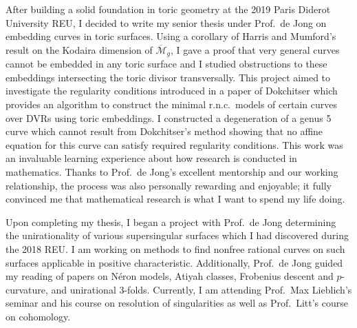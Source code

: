 \documentclass[11pt]{article}
\begin{document}
\par
After building a solid foundation in toric geometry at the 2019 Paris Diderot University REU, I decided to write my senior thesis under Prof.\ de Jong on embedding curves in toric surfaces. Using a corollary of Harris and Mumford's result on the Kodaira dimension of $\overline{\mathcal{M}}_g$, I gave a proof that very general curves cannot be embedded in any toric surface and I studied obstructions to these embeddings intersecting the toric divisor transversally. This project aimed to investigate the regularity conditions introduced in a paper of Dokchitser  which provides an algorithm to construct the minimal r.n.c.\ models of certain curves over DVRs using toric embeddings. I constructed a degeneration of a genus 5 curve which cannot result from Dokchitser's method showing that no affine equation for this curve can satisfy required regularity conditions. This work was an invaluable learning experience about how research is conducted in mathematics. Thanks to Prof.\ de Jong’s excellent mentorship and our working relationship, the process was also personally rewarding and enjoyable; it fully convinced me that mathematical research is what I want to spend my life doing. 
\par
Upon completing my thesis, I began a project with Prof.\ de Jong determining the unirationality of various supersingular surfaces which I had discovered during the 2018 REU.  I am working on methods to find nonfree rational curves on such surfaces applicable in positive characteristic. Additionally, Prof.\ de Jong guided my reading of papers on N\'{e}ron models, Atiyah classes, Frobenius descent and $p$-curvature, and unirational $3$-folds. Currently, I am attending Prof.\ Max Lieblich's seminar and his course on resolution of singularities as well as Prof.\ Litt's course on \etale cohomology.
\par
\end{document}
